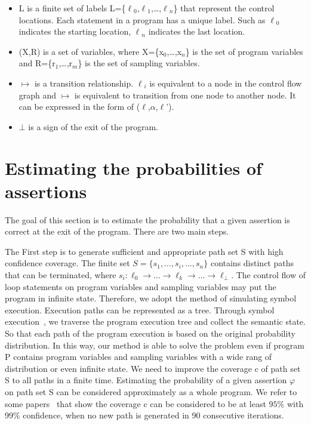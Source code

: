 \begin{itemize}
\item L is a finite set of labels L=\{$\ell$$_0$,$\ell$$_1$,\dots,$\ell$$_n$\} that represent the control locations. Each statement in a program has a unique label. Such as $\ell$$_0$ indicates the starting location, $\ell$$_n$ indicates the last location.

\item (X,R) is a set of variables, where X=\{x$_0$,\dots,x$_n$\} is the set of program variables and R=\{r$_1$,\dots,r$_m$\} is the set of sampling variables.

\item $\mapsto$ is a transition relationship. $\ell$$_i$ is equivalent to a node in the control flow graph and $\mapsto$ is equivalent to transition from one node to another node. It can be expressed in the form of ($\ell$,$\alpha$,$\ell$').

\item $\bot$ is a sign of the exit of the program.
\end{itemize}

\section{Estimating the probabilities of assertions}
The goal of this section is to estimate the probability that a given assertion is correct at the exit of the program. There are two main steps.


The First step is to generate sufficient and appropriate path set S with high confidence coverage. The finite set $S=\{s_1,\dots,s_i,\dots,s_n\}$ contains distinct paths that can be terminated, where $s_i: \ell_0 \to \dots \to \ell_k \to \dots \to \ell_{\bot}$. The control flow of loop statements on program variables and sampling variables may put the program in infinite state. Therefore, we adopt the method of simulating symbol execution. Execution paths can be represented as a tree. Through symbol execution~\cite{Geldenhuys2012symbolic}, we traverse the program execution tree and collect the semantic state. So that each path of the program execution is based on the original probability distribution. In this way, our method is able to solve the problem even if program P contains program variables and sampling variables with a wide rang of distribution or even infinite state. We need to improve the coverage c of path set S to all paths in a finite time. Estimating the probability of a given assertion $\varphi$ on path set S can be considered approximately as a whole program. We refer to some papers~\cite{Sankaranarayanan2013Static} that show the coverage c can be considered to be at least $95\%$ with 99\% confidence, when no new path is generated in 90 consecutive iterations.


